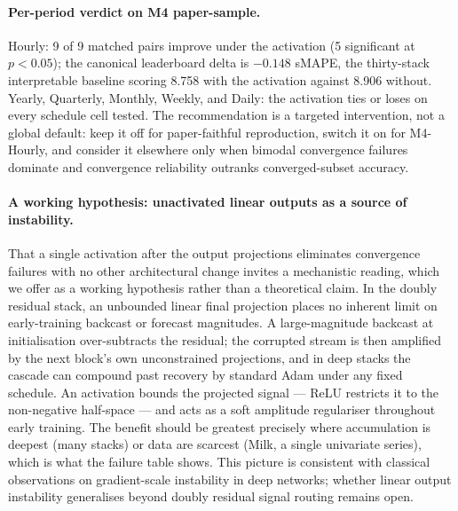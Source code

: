 \paragraph{Per-period verdict on M4 paper-sample.} Hourly: 9 of 9 matched
pairs improve under the activation (5 significant at $p < 0.05$); the
canonical leaderboard delta is $-0.148$ sMAPE, the thirty-stack
interpretable baseline scoring 8.758 with the activation against 8.906
without. Yearly, Quarterly, Monthly, Weekly, and Daily: the activation ties
or loses on every schedule cell tested. The recommendation is a targeted
intervention, not a global default: keep it off for paper-faithful
reproduction, switch it on for M4-Hourly, and consider it elsewhere only
when bimodal convergence failures dominate and convergence reliability
outranks converged-subset accuracy.

\paragraph{A working hypothesis: unactivated linear outputs as a source of
instability.} That a single activation after the output projections
eliminates convergence failures with no other architectural change invites
a mechanistic reading, which we offer as a working hypothesis rather than a
theoretical claim. In the doubly residual stack, an unbounded linear final
projection places no inherent limit on early-training backcast or forecast
magnitudes. A large-magnitude backcast at initialisation over-subtracts the
residual; the corrupted stream is then amplified by the next block's own
unconstrained projections, and in deep stacks the cascade can compound past
recovery by standard Adam under any fixed schedule. An activation bounds
the projected signal --- ReLU restricts it to the non-negative half-space
--- and acts as a soft amplitude regulariser throughout early training. The
benefit should be greatest precisely where accumulation is deepest (many
stacks) or data are scarcest (Milk, a single univariate series), which is
what the failure table shows. This picture is consistent with classical
observations on gradient-scale instability in deep networks; whether linear
output instability generalises beyond doubly residual signal routing
remains open.

